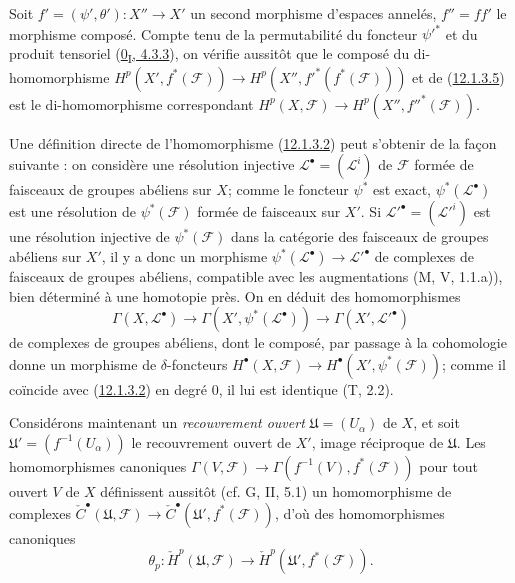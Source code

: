 \begin{env}[12.1.3]
Soit $f'=(\psi',\theta'):X''\to X'$ un second morphisme d'espaces annelés,
$f''=ff'$ le morphisme composé. Compte tenu de la permutabilité du foncteur
$\psi'^*$ et du produit tensoriel
(\hyperref[0.4.3.3-fr]{0\textsubscript{I}, 4.3.3}), on vérifie aussitôt que le
composé du di-homomorphisme
$H^p(X',f^*(\mathcal F))\to H^p(X'',f'^*(f^*(\mathcal F)))$ et de
(\hyperref[0.12.1.3.5-fr]{12.1.3.5}) est le di-homomorphisme correspondant
$H^p(X,\mathcal F)\to H^p(X'',f''^*(\mathcal F))$.
\end{env}

\begin{env}[12.1.4]
\label{0.12.1.4-fr}
Une définition directe de l'homomorphisme
(\hyperref[0.12.1.3.2-fr]{12.1.3.2}) peut s'obtenir de la façon suivante : on
considère une résolution injective $\mathcal L^\bullet=(\mathcal L^i)$ de
$\mathcal F$ formée de faisceaux de groupes abéliens sur $X$; comme le
foncteur $\psi^*$ est exact, $\psi^*(\mathcal L^\bullet)$ est une résolution
de $\psi^*(\mathcal F)$ formée de faisceaux sur $X'$. Si
$\mathcal L'^\bullet=(\mathcal L'^i)$ est une résolution injective de
$\psi^*(\mathcal F)$ dans la catégorie des faisceaux de groupes abéliens sur
$X'$, il y a donc un morphisme
$\psi^*(\mathcal L^\bullet)\to\mathcal L'^\bullet$ de complexes de faisceaux
de groupes abéliens, compatible avec les augmentations (M, V, 1.1.a)), bien
déterminé à une homotopie près. On en déduit des homomorphismes
\[
\Gamma(X,\mathcal L^\bullet)\longrightarrow
\Gamma(X',\psi^*(\mathcal L^\bullet))\longrightarrow
\Gamma(X',\mathcal L'^\bullet)
\]
de complexes de groupes abéliens, dont le composé, par passage à la
cohomologie donne un morphisme de $\delta$-foncteurs
$H^\bullet(X,\mathcal F)\to H^\bullet(X',\psi^*(\mathcal F))$; comme il
coïncide avec (\hyperref[0.12.1.3.2-fr]{12.1.3.2}) en degré 0, il lui est
identique (T, 2.2).

Considérons maintenant un \emph{recouvrement ouvert}
$\mathfrak U=(U_\alpha)$ de $X$, et soit
$\mathfrak U'=(f^{-1}(U_\alpha))$ le recouvrement ouvert de $X'$, image
réciproque de $\mathfrak U$. Les homomorphismes canoniques
$\Gamma(V,\mathcal F)\to\Gamma(f^{-1}(V),f^*(\mathcal F))$ pour tout ouvert
$V$ de $X$ définissent aussitôt (cf. G, II, 5.1) un homomorphisme de complexes
$\check C^\bullet(\mathfrak U,\mathcal F)\to
\check C^\bullet(\mathfrak U',f^*(\mathcal F))$, d'où des homomorphismes
canoniques
\[
\label{0.12.1.4.1-fr}
\tag{12.1.4.1}
\theta_p:\check H^p(\mathfrak U,\mathcal F)
\longrightarrow\check H^p(\mathfrak U',f^*(\mathcal F)).
\]


\end{env}
